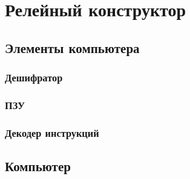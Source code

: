 \documentclass{book}
\begin{document}
\tableofcontents

\part{Релейный конструктор}









\chapter{Элементы компьютера}

\section{Дешифратор}

\section{ПЗУ}

\section{Декодер инструкций}

\chapter{Компьютер}
\end{document}
